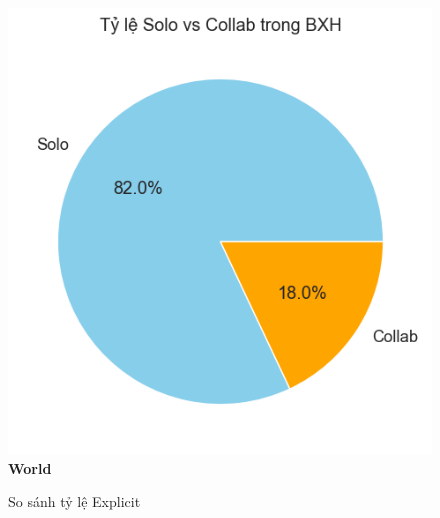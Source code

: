 \begin{itemize}
\begin{figure}[H]
\begin{minipage}{0.38\textwidth}
            \includegraphics[width=\linewidth]{../graphics/data_top50/figure/21/EDA_world.png}
            \\[4pt] {\small \textbf{World}}
        \end{minipage}

        \caption{So sánh tỷ lệ Explicit }
        \label{fig:explicit-japan-world}
    \end{figure}
    







\end{itemize}

